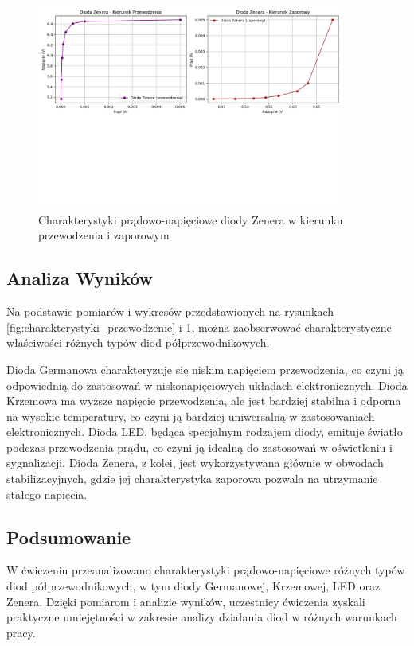\documentclass[10.5pt]{article}
\begin{document}
\begin{figure}[H]
    \centering
    \includegraphics[width=0.9\textwidth]{Figure_2.png}
    \caption{Charakterystyki prądowo-napięciowe diody Zenera w kierunku przewodzenia i zaporowym}
    \label{fig:charakterystyki_zaporowy}
\end{figure}
\subsection*{Analiza Wyników}
Na podstawie pomiarów i wykresów przedstawionych na rysunkach \ref{fig:charakterystyki_przewodzenie} i \ref{fig:charakterystyki_zaporowy}, można zaobserwować charakterystyczne właściwości różnych typów diod półprzewodnikowych.

Dioda Germanowa charakteryzuje się niskim napięciem przewodzenia, co czyni ją odpowiednią do zastosowań w niskonapięciowych układach elektronicznych.
Dioda Krzemowa ma wyższe napięcie przewodzenia, ale jest bardziej stabilna i odporna na wysokie temperatury, co czyni ją bardziej uniwersalną w zastosowaniach elektronicznych.
Dioda LED, będąca specjalnym rodzajem diody, emituje światło podczas przewodzenia prądu, co czyni ją idealną do zastosowań w oświetleniu i sygnalizacji.
Dioda Zenera, z kolei, jest wykorzystywana głównie w obwodach stabilizacyjnych, gdzie jej charakterystyka zaporowa pozwala na utrzymanie stałego napięcia.

\subsection*{Podsumowanie}
W ćwiczeniu przeanalizowano charakterystyki prądowo-napięciowe różnych typów diod półprzewodnikowych, w tym diody Germanowej, Krzemowej, LED oraz Zenera.
Dzięki pomiarom i analizie wyników, uczestnicy ćwiczenia zyskali praktyczne umiejętności w zakresie analizy działania diod w różnych warunkach pracy.
\end{document}

